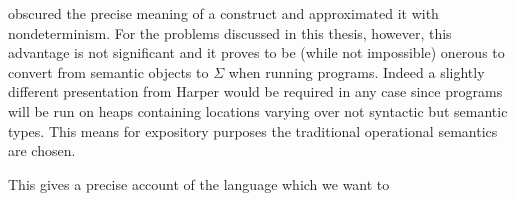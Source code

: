 obscured the precise meaning of a construct and approximated it with
nondeterminism. For the problems discussed in this thesis, however,
this advantage is not significant and it proves to be (while not
impossible) onerous to convert from semantic objects to $\Sigma$ when
running programs. Indeed a slightly different presentation from Harper
would be required in any case since programs will be run on heaps
containing locations varying over not syntactic but semantic
types. This means for expository purposes the traditional operational
semantics are chosen.
This gives a precise account of the language which we want to

